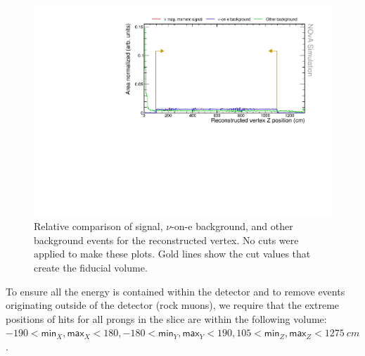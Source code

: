 \begin{figure}[hbtp]
\includegraphics[width=.9\textwidth]{Plots/NuMMEventSelection/NoCut_vtxZ.pdf}
\caption{Relative comparison of signal, $\nu$-on-e background, and other background events for the reconstructed vertex. No cuts were applied to make these plots. Gold lines show the cut values that create the fiducial volume.}
\label{fig:FiducialCut}
\end{figure}

To ensure all the energy is contained within the detector and to remove events originating outside of the detector (rock muons), we require that the extreme positions of hits for all prongs in the slice are within the following volume: $-190<\textsf{min}_X, \textsf{max}_X<180, -180<\textsf{min}_Y, \textsf{max}_Y<190, 105<\textsf{min}_Z, \textsf{max}_Z<1275\ \unit{cm}$.

